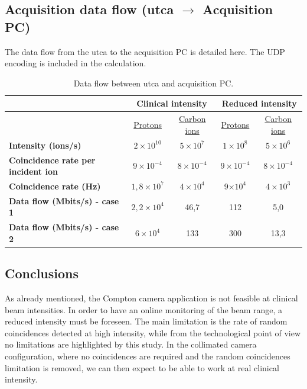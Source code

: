 \subsection{Acquisition data flow (\gls{utca} $\rightarrow$ Acquisition PC)}\label{chapappA::subsec::daqDataFlow}
The data flow from the \gls{utca} to the acquisition PC is detailed here. The UDP encoding is included in the calculation.

\begin{table} [!htbp]
\centering
\caption{Data flow between \gls{utca} and acquisition PC.}
\label{chapappA::tab::dataFlowuTCAPC}
\begin{tabular}{m{3.5cm} c c c c}
\toprule
\rowcolor{myColorMainA!20}
		&\multicolumn{2}{c}{	\textbf{Clinical intensity}} &\multicolumn{2}{c}{ \textbf{Reduced intensity}} \\
\midrule
		& \underline{Protons}& \underline{Carbon ions} & \underline{Protons}& \underline{Carbon ions} \\
\midrule
\textbf{Intensity (ions/s)}		& $2\times10^{10}$	&$5\times10^{7}$  & $1\times10^{8}$& $5\times10^{6}$\\
\textbf{Coincidence rate per incident ion}		& $9\times10^{-4}$&  $8\times10^{-4}$&  $9\times10^{-4}$& $8\times10^{-4}$ \\
\textbf{Coincidence rate (Hz)}		& $1,8\times10^{7}$&  $4\times10^{4}$&  9$\times10^{4}$& $4\times10^{3}$\\
\textbf{Data flow (Mbits/s) - case 1}		&$2,2\times10^{4}$ &  46,7&  112& 5,0\\
\textbf{Data flow (Mbits/s) - case 2}		& $6\times10^{4}$&  133&  300& 13,3\\
\bottomrule
\end{tabular}
\end{table}

\subsection{Conclusions}\label{chapappA::subsec::conclusions}
As already mentioned, the Compton camera application is not feasible at clinical beam intensities. \newline
In order to have an online monitoring of the beam range, a reduced intensity must be foreseen. The main limitation is the rate of random coincidences detected at high intensity, while from the technological point of view no limitations are highlighted by this study. In the collimated camera configuration, where no coincidences are required and the random coincidences limitation is removed, we can then expect to be able to work at real clinical intensity.


